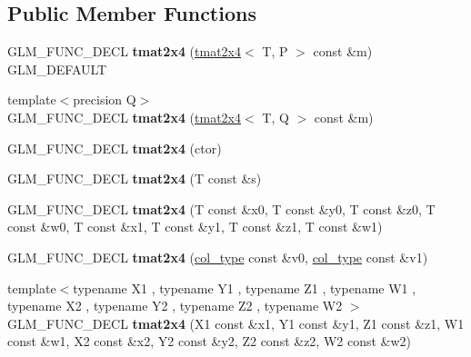 \subsection*{Public Member Functions}
\begin{DoxyCompactItemize}
\item 
\hypertarget{structglm_1_1tmat2x4_aa14cd9654d8abcb64b4357eb1264d770}{G\-L\-M\-\_\-\-F\-U\-N\-C\-\_\-\-D\-E\-C\-L {\bfseries tmat2x4} (\hyperlink{structglm_1_1tmat2x4}{tmat2x4}$<$ T, P $>$ const \&m) G\-L\-M\-\_\-\-D\-E\-F\-A\-U\-L\-T}\label{structglm_1_1tmat2x4_aa14cd9654d8abcb64b4357eb1264d770}

\item 
\hypertarget{structglm_1_1tmat2x4_acde6e5b863afd65e1608a8fe2a374d53}{{\footnotesize template$<$precision Q$>$ }\\G\-L\-M\-\_\-\-F\-U\-N\-C\-\_\-\-D\-E\-C\-L {\bfseries tmat2x4} (\hyperlink{structglm_1_1tmat2x4}{tmat2x4}$<$ T, Q $>$ const \&m)}\label{structglm_1_1tmat2x4_acde6e5b863afd65e1608a8fe2a374d53}

\item 
\hypertarget{structglm_1_1tmat2x4_ac8fa66d023e6fe449dc51287eb1c3e47}{G\-L\-M\-\_\-\-F\-U\-N\-C\-\_\-\-D\-E\-C\-L {\bfseries tmat2x4} (ctor)}\label{structglm_1_1tmat2x4_ac8fa66d023e6fe449dc51287eb1c3e47}

\item 
\hypertarget{structglm_1_1tmat2x4_af356346f5e5100cc94a321f4d1c40db1}{G\-L\-M\-\_\-\-F\-U\-N\-C\-\_\-\-D\-E\-C\-L {\bfseries tmat2x4} (T const \&s)}\label{structglm_1_1tmat2x4_af356346f5e5100cc94a321f4d1c40db1}

\item 
\hypertarget{structglm_1_1tmat2x4_a83c8435588fd810335790829839518a6}{G\-L\-M\-\_\-\-F\-U\-N\-C\-\_\-\-D\-E\-C\-L {\bfseries tmat2x4} (T const \&x0, T const \&y0, T const \&z0, T const \&w0, T const \&x1, T const \&y1, T const \&z1, T const \&w1)}\label{structglm_1_1tmat2x4_a83c8435588fd810335790829839518a6}

\item 
\hypertarget{structglm_1_1tmat2x4_ae6dbe93cebe353d338aef52f561100fd}{G\-L\-M\-\_\-\-F\-U\-N\-C\-\_\-\-D\-E\-C\-L {\bfseries tmat2x4} (\hyperlink{structglm_1_1tvec4}{col\-\_\-type} const \&v0, \hyperlink{structglm_1_1tvec4}{col\-\_\-type} const \&v1)}\label{structglm_1_1tmat2x4_ae6dbe93cebe353d338aef52f561100fd}

\item 
\hypertarget{structglm_1_1tmat2x4_a2b4b734e70d43d8261dbad49b9138fa2}{{\footnotesize template$<$typename X1 , typename Y1 , typename Z1 , typename W1 , typename X2 , typename Y2 , typename Z2 , typename W2 $>$ }\\G\-L\-M\-\_\-\-F\-U\-N\-C\-\_\-\-D\-E\-C\-L {\bfseries tmat2x4} (X1 const \&x1, Y1 const \&y1, Z1 const \&z1, W1 const \&w1, X2 const \&x2, Y2 const \&y2, Z2 const \&z2, W2 const \&w2)}\label{structglm_1_1tmat2x4_a2b4b734e70d43d8261dbad49b9138fa2}


\end{DoxyCompactItemize}
